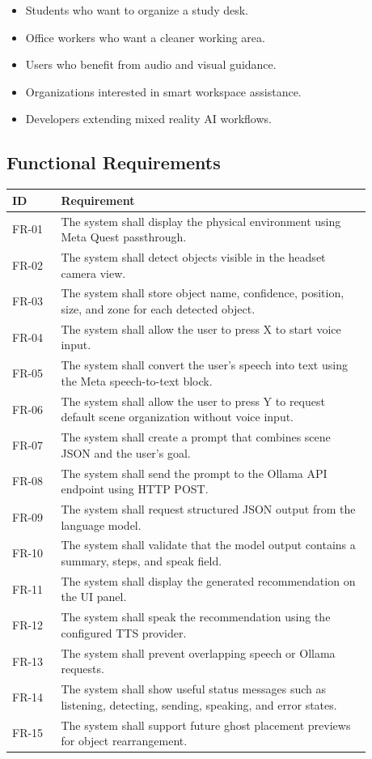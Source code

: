 \documentclass[12pt,a4paper]{article}
\begin{document}
\begin{itemize}
    \item Students who want to organize a study desk.
    \item Office workers who want a cleaner working area.
    \item Users who benefit from audio and visual guidance.
    \item Organizations interested in smart workspace assistance.
    \item Developers extending mixed reality AI workflows.
\end{itemize}

\subsection{Functional Requirements}

\begin{longtable}{p{0.12\linewidth} p{0.76\linewidth}}
\toprule
\textbf{ID} & \textbf{Requirement}\\
\midrule
FR-01 & The system shall display the physical environment using Meta Quest passthrough.\\
FR-02 & The system shall detect objects visible in the headset camera view.\\
FR-03 & The system shall store object name, confidence, position, size, and zone for each detected object.\\
FR-04 & The system shall allow the user to press X to start voice input.\\
FR-05 & The system shall convert the user's speech into text using the Meta speech-to-text block.\\
FR-06 & The system shall allow the user to press Y to request default scene organization without voice input.\\
FR-07 & The system shall create a prompt that combines scene JSON and the user's goal.\\
FR-08 & The system shall send the prompt to the Ollama API endpoint using HTTP POST.\\
FR-09 & The system shall request structured JSON output from the language model.\\
FR-10 & The system shall validate that the model output contains a summary, steps, and speak field.\\
FR-11 & The system shall display the generated recommendation on the UI panel.\\
FR-12 & The system shall speak the recommendation using the configured TTS provider.\\
FR-13 & The system shall prevent overlapping speech or Ollama requests.\\
FR-14 & The system shall show useful status messages such as listening, detecting, sending, speaking, and error states.\\
FR-15 & The system shall support future ghost placement previews for object rearrangement.\\
\bottomrule
\end{longtable}
\end{document}
